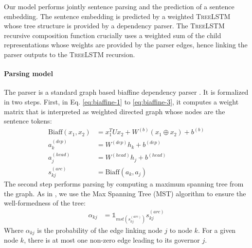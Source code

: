Our model performs jointly sentence parsing and the prediction of a sentence embedding. The sentence embedding is predicted by a weighted \textsc{TreeLSTM} whose tree structure is provided by a dependency parser.
The \textsc{TreeLSTM} recursive composition function crucially uses a weighted sum of the child representations whose weights are provided by the parser edges, hence linking the parser outputs to the \textsc{TreeLSTM} recursion.

\paragraph{Parsing model} The parser is a standard graph based biaffine dependency parser \parencite{dozat_17}.
It is formalized in two steps.
First, in Eq. \ref{eq:biaffine-1} to \ref{eq:biaffine-3},
it computes a weight matrix that is interpreted as weighted directed graph whose nodes are the sentence tokens:
\begin{align}
   \text{Biaff}(x_1,x_2) &=  x_1^T U x_2 + W^{(b)}(x_1 \oplus x_2)+b^{(b)} \\
    a_k^{(dep)} &= W^{(dep)}h_k + b^{(dep)} \label{eq:biaffine-1} \\
    a_j^{(head)} &= W^{(head)}h_j + b^{(head)} \label{eq:biaffine-2}\\
    s^{(arc)}_{kj} &= \text{Biaff}(a_k,a_j) \label{eq:biaffine-3}
\end{align}%
The second step performs parsing by computing a maximum spanning tree from the graph. As in \textcite{dozat_17}, we use the Max Spanning Tree (MST) algorithm to ensure the well-formedness of the tree: 
\begin{align}
 \alpha_{kj} &= \mathbb{1}_{mst(s^{(arc)}_{kj})} s^{(arc)}_{kj} \label{eq:biaffine-alpha}
\end{align}
Where $\alpha_{kj}$ is the probability of the edge linking node $j$ to node $k$. For a given node $k$, there is at most one non-zero edge leading to its governor $j$.

